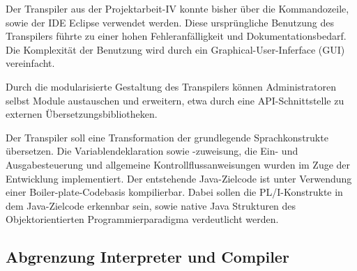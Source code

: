 Der Transpiler aus der Projektarbeit-IV konnte bisher über die Kommandozeile, sowie der IDE Eclipse verwendet werden. Diese ursprüngliche Benutzung des Transpilers führte zu einer hohen Fehleranfälligkeit und Dokumentationsbedarf. Die Komplexität der Benutzung wird durch ein Graphical-User-Inferface (GUI) vereinfacht.

Durch die modularisierte Gestaltung des Transpilers können Administratoren selbst Module austauschen und erweitern, etwa durch eine API-Schnittstelle zu externen Übersetzungsbibliotheken. 


Der Transpiler soll eine Transformation der grundlegende Sprachkonstrukte übersetzen. Die Variablendeklaration sowie -zuweisung, die Ein- und Ausgabesteuerung und allgemeine Kontrollflussanweisungen wurden im Zuge der Entwicklung implementiert. Der entstehende Java-Zielcode ist unter Verwendung einer Boiler-plate-Codebasis kompilierbar. Dabei sollen die PL/I-Konstrukte in dem Java-Zielcode erkennbar sein, sowie native Java Strukturen des Objektorientierten Programmierparadigma verdeutlicht werden.

%
	
 
    \pagebreak

\subsection{Abgrenzung Interpreter und Compiler}
  
